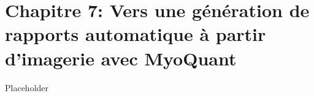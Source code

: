 \chapter*{Chapitre 7: Vers une génération de rapports automatique à partir d’imagerie avec MyoQuant}
Placeholder